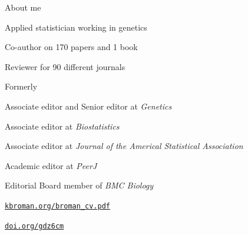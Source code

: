 \documentclass[aspectratio=169,12pt,t]{beamer}
\begin{document}
\begin{frame}{About me}

  \vspace{-12pt}

  \bbi
\item Applied statistician working in genetics
\item Co-author on 170 papers and 1 book
\item Reviewer for 90 different journals
\item Formerly
  \bi
\item Associate editor and Senior editor at \emph{Genetics}
\item Associate editor at \emph{Biostatistics}
\item Associate editor at \emph{Journal of the Americal Statistical
Association}
\item Academic editor at \emph{PeerJ}
\item Editorial Board member of \emph{BMC Biology}
  \ei
  \ei

  \vspace{30pt}
  \hfill
  \href{https://kbroman.org/broman_cv.pdf}{\tt \footnotesize \lolit kbroman.org/broman{\_}cv.pdf}

\end{frame}



\begin{frame}[c]{}

  \vspace{24pt}

  \centerline{}

  \vfill
  \hfill
  \href{https://doi.org/gdz6cm}{\tt \footnotesize \lolit doi.org/gdz6cm}

  \note{
  }
\end{frame}


\begin{frame}[c]{}

  \note{
  }
\end{frame}
\end{document}
